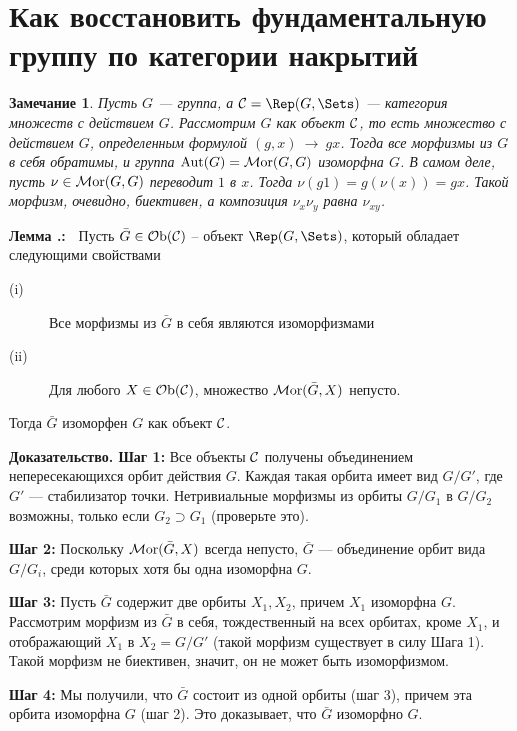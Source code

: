 \documentclass[12pt]{book}
\newcommand{\arrow}{{\:\longrightarrow\:}}
\def\endproof{\hbox{\vrule width 5pt height 5pt depth 0pt}}
\def\Aut{\operatorname{Aut}}
\newcommand{\Ob}{\operatorname{{\cal O}b}}
\newcommand{\Mor}{\operatorname{{\cal M}or}}
\newcommand{\cac}{{\cal C}}
\theoremstyle{upshape}
\newtheorem{zadacha}{Задача}[chapter]
\theoremstyle{generic}
\newtheorem{remark}[teorema]{Замечание}
\def\замечание{\begin{remark}}
\def\еза{\end{remark}}
\theoremstyle{upshapenonumber}
\newcommand{\следствие}{%
     \refstepcounter{teorema}
     {\noindent\bf Следствие \thechapter.\arabic{teorema}:\ }}
\newcommand{\пример}{%
     \refstepcounter{teorema}
     {\noindent\bf Пример \thechapter.\arabic{teorema}:\ }}
\newcommand{\лемма}{%
     \refstepcounter{teorema}
     {\noindent\bf Лемма \thechapter.\arabic{teorema}:\ }}
\newcommand{\теорема}{%
     \refstepcounter{teorema}
     {\noindent\bf Теорема \thechapter.\arabic{teorema}:\ }}
\newcommand{\утверждение}{%
     \refstepcounter{teorema}
     {\noindent\bf Утверждение \thechapter.\arabic{teorema}:\ }}
\def\ем{\em}
\def\задача{\begin{zadacha}}
\def\ез{\end{zadacha}}
\def\еу{\end{ukazanie}}
\def\ео{\end{opredelenie}}
\def\енум{\begin{enumerate}}
\def\ее{\end{enumerate}}
\begin{document}
\section{Как восстановить фундаментальную группу по 
категории накрытий}


\замечание
Пусть $G$ --- группа, а $\cac=\Rep(G, \Sets)$ --- категория
множеств с действием $G$. Рассмотрим  $G$
как объект $\cac$, то есть множество с действием
$G$, определенным формулой $(g, x)\arrow gx$. 
Тогда все морфизмы из $G$ в себя обратимы,
и группа $\Aut(G)=\Mor(G,G)$ изоморфна $G$. В самом деле,
пусть $\nu\in \Mor(G, G)$ переводит $1$ в $x$.
Тогда $\nu(g1) = g(\nu(x))= gx$. Такой морфизм,
очевидно, биективен, а композиция  $\nu_x\nu_y$ равна $\nu_{xy}$.
\еза


\лемма
Пусть $\bar G \in \Ob(\cac)$
-- объект $\Rep(G, \Sets)$, который обладает следующими
свойствами
\begin{description}
\item[(i)] Все морфизмы из $\bar G$ в себя являются изоморфизмами
\item[(ii)] Для любого $X\in \Ob(\cac)$, множество
$\Mor(\bar G, X)$ непусто.
\end{description}
Тогда $\bar G$ изоморфен $G$ как объект $\cac$.

\hfill

\noindent
{\bf Доказательство. Шаг 1:} Все объекты $\cac$ получены
объединением непересекающихся орбит действия $G$.
Каждая такая орбита имеет вид $G/G'$, где $G'$ --- стабилизатор
точки. Нетривиальные морфизмы из орбиты
$G/G_1$ в $G/G_2$ возможны, только если
$G_2\supset G_1$ (проверьте это).

\hfill

\noindent
{\bf Шаг 2:} Поскольку $\Mor(\bar G, X)$ всегда 
непусто, $\bar G$ --- объединение орбит вида $G/G_i$,
среди которых хотя бы одна изоморфна $G$.


\hfill

\noindent
{\bf Шаг 3:} Пусть $\bar G$ содержит две орбиты $X_1,
X_2$, причем $X_1$ изоморфна $G$. Рассмотрим морфизм из $\bar G$
в себя, тождественный на всех орбитах, кроме  $X_1$, и
отображающий $X_1$ в $X_2= G /G'$ (такой морфизм существует
в силу Шага 1). Такой морфизм не биективен, значит, 
он не может быть изоморфизмом.



\hfill

\noindent
{\bf Шаг 4:} Мы получили, что $\bar G$ состоит из одной орбиты
(шаг 3), причем эта орбита изоморфна $G$ (шаг 2).
Это доказывает, что $\bar G$ изоморфно $G$. \endproof
\end{document}
